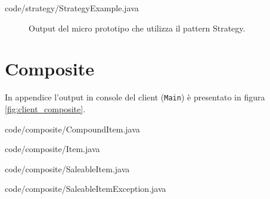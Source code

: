 \documentclass[12pt]{article}
\begin{document}

{code/strategy/StrategyExample.java}

\begin{figure}[!h]
  \caption{\small Output del micro prototipo che utilizza il pattern Strategy.}
  \label{fig:client_strategy}
\end{figure}


\newpage
\section{Composite}
\label{appendix:composite}

In appendice l'output in console del client ({\tt Main}) è presentato in figura \ref{fig:client_composite}.


{code/composite/CompoundItem.java}


{code/composite/Item.java}


{code/composite/SaleableItem.java}


{code/composite/SaleableItemException.java}
\end{document}
